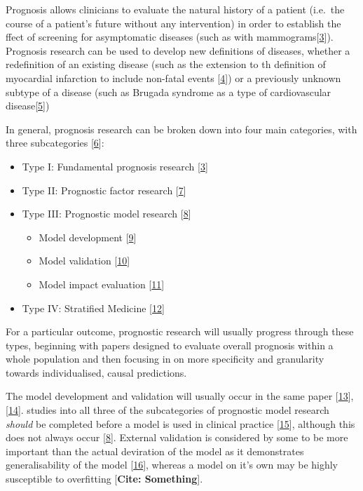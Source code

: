 \documentclass[12pt,PhD,twoside,openright]{muthesis}
\providecommand{\tightlist}{%
  \setlength{\itemsep}{0pt}\setlength{\parskip}{0pt}}
\begin{document}
Prognosis allows clinicians to evaluate the natural history of a patient (i.e.~the course of a patient's future without any intervention) in order to establish the ffect of screening for asymptomatic diseases (such as with mammograms{[}\protect\hyperlink{ref-hemingway_prognosis_2013}{3}{]}). Prognosis research can be used to develop new definitions of diseases, whether a redefinition of an existing disease (such as the extension to th definition of myocardial infarction to include non-fatal events {[}\protect\hyperlink{ref-thygesen_universal_2007}{4}{]}) or a previously unknown subtype of a disease (such as Brugada syndrome as a type of cardiovascular disease{[}\protect\hyperlink{ref-probst_long-term_2010}{5}{]})

In general, prognosis research can be broken down into four main categories, with three subcategories {[}\protect\hyperlink{ref-riley_prognosis_2019}{6}{]}:
\begin{itemize}
\tightlist
\item
  Type I: Fundamental prognosis research {[}\protect\hyperlink{ref-hemingway_prognosis_2013}{3}{]}
\item
  Type II: Prognostic factor research {[}\protect\hyperlink{ref-riley_prognosis_2013}{7}{]}
\item
  Type III: Prognostic model research {[}\protect\hyperlink{ref-steyerberg_prognosis_2013}{8}{]}
  \begin{itemize}
  \tightlist
  \item
    Model development {[}\protect\hyperlink{ref-royston_prognosis_2009}{9}{]}
  \item
    Model validation {[}\protect\hyperlink{ref-altman_prognosis_2009}{10}{]}
  \item
    Model impact evaluation {[}\protect\hyperlink{ref-moons_prognosis_2009}{11}{]}
  \end{itemize}
\item
  Type IV: Stratified Medicine {[}\protect\hyperlink{ref-hingorani_prognosis_2013}{12}{]}
\end{itemize}
For a particular outcome, prognostic research will usually progress through these types, beginning with papers designed to evaluate overall prognosis within a whole population and then focusing in on more specificity and granularity towards individualised, causal predictions.

The model development and validation will usually occur in the same paper {[}\protect\hyperlink{ref-collins_transparent_2015}{13}{]}, {[}\protect\hyperlink{ref-moons_transparent_2015}{14}{]}. studies into all three of the subcategories of prognostic model research \emph{should} be completed before a model is used in clinical practice {[}\protect\hyperlink{ref-riley_external_2016}{15}{]}, although this does not always occur {[}\protect\hyperlink{ref-steyerberg_prognosis_2013}{8}{]}. External validation is considered by some to be more important than the actual deviration of the model as it demonstrates generalisability of the model {[}\protect\hyperlink{ref-collins_systematic_2013}{16}{]}, whereas a model on it's own may be highly susceptible to overfitting {[}\textbf{Cite: Something}{]}.
\end{document}
